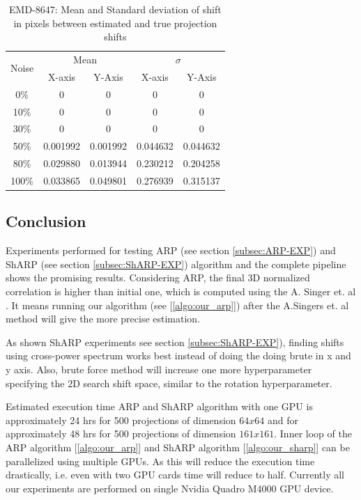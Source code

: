 \documentclass{report}
\begin{document}
\begin{table}[H]
    \centering
     \begin{tabular}{||c|c|c|c|c||} 
             \hline
            \multirow{2}{*}{Noise} 
             & \multicolumn{2}{c|}{Mean} 
             & \multicolumn{2}{c|}{$\sigma$} \\
             \cline{2-5}
             & X-axis & Y-Axis & X-axis & Y-Axis\\
            \hline\hline
            0\%   & 0 & 0 & 0 & 0 \\\hline
            10\%  &0 & 0 & 0 & 0 \\\hline
            30\%  &0 & 0 & 0 & 0 \\\hline
            50\%  &0.001992 & 0.001992 & 0.044632 & 0.044632 \\\hline
            80\%  &0.029880 & 0.013944 & 0.230212 & 0.204258 \\\hline
            100\% &0.033865 & 0.049801 & 0.276939 & 0.315137 \\\hline
            \hline
    \end{tabular}
    \captionsetup{justification=centering}
    \caption{EMD-8647: Mean and Standard deviation of shift in pixels between estimated and true projection shifts}
    \label{tbl:our_sharp_8647_result-trans-error}
\end{table}

\subsection{Conclusion}

Experiments performed for testing ARP (see section \ref{subsec:ARP-EXP}) and ShARP (see section \ref{subsec:ShARP-EXP}) algorithm and the complete pipeline shows the promising results. Considering ARP, the final 3D normalized correlation is higher than initial one, which is computed using the A. Singer et. al \cite{singer2009threeAngleEstimate}. It means running our algorithm (see [\ref{algo:our_arp}]) after the A.Singers et. al \cite{singer2009threeAngleEstimate} method will give the more precise estimation. 

As shown ShARP experiments see section \ref{subsec:ShARP-EXP}), finding shifts using cross-power spectrum works best instead of doing the doing brute in x and y axis. Also, brute force method will increase one more hyperparameter specifying the 2D search shift space, similar to the rotation hyperparameter.  

Estimated execution time ARP and ShARP algorithm with one GPU is approximately 24 hrs for 500 projections of dimension $64x64$ and for approximately 48 hrs for 500 projections of dimension $161x161$. Inner loop of the ARP algorithm [\ref{algo:our_arp}] and ShARP algorithm [\ref{algo:our_sharp}] can be parallelized using multiple GPUs. As this will reduce the execution time drastically, i.e. even with two GPU cards time will reduce to half. Currently all our experiments are performed on single Nvidia Quadro M4000 GPU device. 
\end{document}
